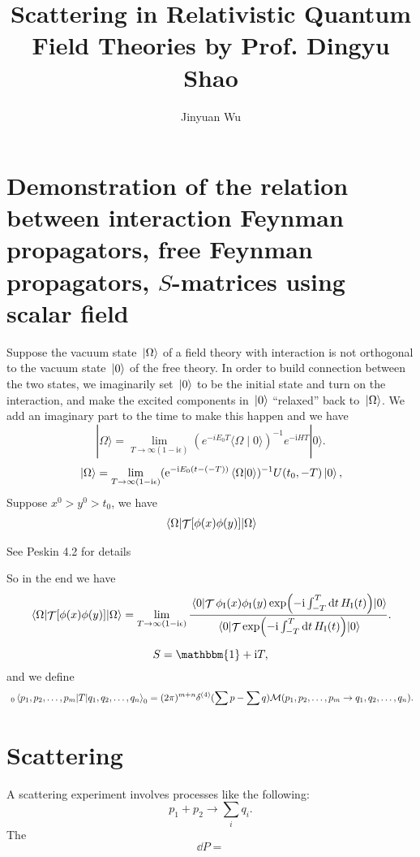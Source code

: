 \documentclass[hyperref, a4paper]{article}
\title{Scattering in Relativistic Quantum Field Theories by Prof. Dingyu Shao}
\author{Jinyuan Wu}
\DeclareMathOperator{\timeorder}{\mathcal{T}}
\newcommand*{\ii}{\mathrm{i}}
\newcommand*{\ee}{\mathrm{e}}
\begin{document}
\maketitle

\section{Demonstration of the relation between interaction Feynman propagators, free Feynman propagators, $S$-matrices using scalar field}

Suppose the vacuum state $\ket*{\Omega}$ of a field theory with interaction is not orthogonal to the vacuum state $\ket*{0}$ of the free theory.
In order to build connection between the two states, we imaginarily set $\ket*{0}$ to be the initial state and turn on the interaction, 
and make the excited components in $\ket*{0}$ ``relaxed'' back to $\ket*{\Omega}$.
We add an imaginary part to the time to make this happen and we have 
\[
    |\Omega\rangle=\lim _{T \rightarrow \infty(1-\ii \epsilon)}\left(e^{-i E_{0} T}\langle\Omega \mid 0\rangle\right)^{-1} e^{-\ii H T}|0\rangle.
\]
\begin{equation}
    \ket*{\Omega} = \lim_{T \to \infty(1 - \ii \epsilon)} (\ee^{- \ii E_0 (t - (-T))} \braket*{\Omega}{0})^{-1} U(t_0, -T) \ket*{0},
\end{equation}
Suppose $x^0 > y^0 > t_0$, we have 
\[
    \begin{aligned}
        \expval*{\timeorder[\phi(x) \phi(y)]}{\Omega} 
    \end{aligned}
\]

See Peskin 4.2 for details

So in the end we have
\begin{equation}
    \expval*{\timeorder[\phi(x) \phi(y)]}{\Omega} = \lim_{T \to \infty(1 - \ii \epsilon)} \frac{\expval*{\timeorder \phi_\text{I}(x) \phi_\text{I}(y) \exp (- \ii \int_{-T}^T \dd{t} H_\text{I}(t))}{0}}{\expval*{\timeorder \exp(- \ii \int_{-T}^T \dd{t} H_\text{I}(t))}{0}}.
\end{equation}

\begin{equation}
    S = \mathbbm{1} + \ii T ,
\end{equation}
and we define 
\begin{equation}
    \ _0\mel{p_1, p_2, \ldots, p_m}{T}{q_1, q_2, \ldots, q_n}_0 = (2\pi)^{m+n} \delta^{(4)}(\sum p - \sum q) \mathcal{M}(p_1, p_2, \ldots, p_m \to q_1, q_2, \ldots, q_n).
\end{equation}

\section{Scattering}

A scattering experiment involves processes like the following:
\begin{equation}
    p_1 + p_2 \longrightarrow \sum_{i} q_i.
\end{equation}
The 
\begin{equation}
    \dd{P} = 
\end{equation}
\end{document}
